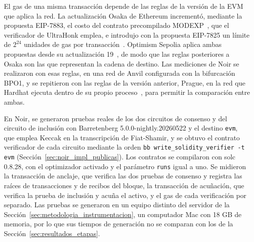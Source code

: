 El gas de una misma transacción depende de las reglas de la versión de la EVM que aplica la red. La
actualización Osaka de Ethereum incrementó, mediante la propuesta EIP-7883, el costo del contrato
precompilado MODEXP~\cite{eip7883}, que el verificador de UltraHonk emplea, e introdujo con la
propuesta EIP-7825 un límite de $2^{24}$ unidades de gas por transacción~\cite{eip7825}. Optimism
Sepolia aplica ambas propuestas desde su actualización 19~\cite{oposakal2}, de modo que las reglas
posteriores a Osaka son las que representan la cadena de destino. Las mediciones de Noir se
realizaron con esas reglas, en una red de Anvil configurada con la bifurcación BPO1, y se
repitieron con las reglas de la versión anterior, Prague, en la red que Hardhat ejecuta dentro de
su propio proceso~\cite{hardhatdocs}, para permitir la comparación entre ambas.

En Noir, se generaron pruebas reales de los dos circuitos de consenso y del circuito de inclusión
con Barretenberg 5.0.0-nightly.20260522 y el destino \lstinline|evm|, que emplea Keccak en la
transcripción de Fiat-Shamir, y se obtuvo el contrato verificador de cada circuito mediante la orden
\texttt{bb write\_solidity\_verifier -t evm} (Sección~\ref{sec:noir_impl_publicas}). Los contratos
se compilaron con solc 0.8.28, con el optimizador activado y el parámetro \texttt{runs} igual a
uno. Se midieron la transacción de anclaje, que verifica las dos pruebas de consenso y registra las
raíces de transacciones y de recibos del bloque, la transacción de acuñación, que verifica la prueba de inclusión y
acuña el activo, y el gas de cada verificación por separado. Las pruebas se generaron en un equipo
distinto del servidor de la Sección~\ref{sec:metodologia_instrumentacion}, un computador Mac con
18 GB de memoria, por lo que sus tiempos de generación no se comparan con los de la
Sección~\ref{sec:resultados_etapas}.

